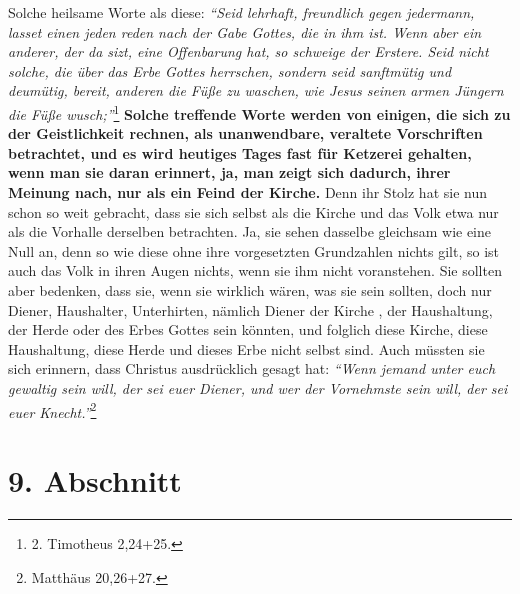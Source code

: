 Solche heilsame Worte als diese:
\textit{"`Seid lehrhaft, freundlich gegen jedermann,
lasset einen jeden reden nach der Gabe Gottes, die in ihm ist. Wenn aber ein
anderer, der da sizt, eine Offenbarung hat, so schweige der Erstere. Seid nicht
solche, die über das Erbe Gottes herrschen, sondern seid sanftmütig und
deumütig, bereit, anderen die Füße zu waschen, wie Jesus seinen armen Jüngern die
Füße wusch;"'}\footnote{2. Timotheus 2,24+25.}
\textbf{Solche treffende Worte werden von
einigen, die sich zu der Geistlichkeit rechnen, als
unanwendbare, veraltete
Vorschriften betrachtet, und es wird heutiges Tages fast für
Ketzerei gehalten,
wenn man sie daran erinnert, ja, man zeigt sich dadurch, ihrer Meinung nach, nur
als ein Feind der Kirche.} Denn ihr Stolz hat sie nun
schon so weit gebracht,
dass sie sich selbst als die Kirche und das Volk etwa nur als die Vorhalle
derselben betrachten. Ja, sie sehen dasselbe gleichsam wie eine Null an, denn so
wie diese ohne ihre vorgesetzten Grundzahlen nichts gilt, so ist auch das Volk
in
ihren Augen nichts, wenn sie ihm nicht voranstehen. Sie sollten aber bedenken,
dass sie, wenn sie wirklich wären, was sie sein sollten, doch nur Diener,
Haushalter, Unterhirten, nämlich Diener der Kirche
, der
Haushaltung, der Herde
oder des Erbes Gottes sein könnten, und folglich diese Kirche, diese
Haushaltung, diese Herde und dieses Erbe nicht selbst sind. Auch müssten sie
sich erinnern, dass Christus ausdrücklich gesagt hat:
\textit{"`Wenn jemand unter euch
gewaltig sein will, der sei euer Diener, und wer der Vornehmste sein will, der
sei euer Knecht."'}\footnote{Matthäus 20,26+27.}

\section{9. Abschnitt} \label{kap12_ab9}

